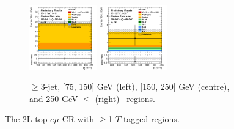 \begin{figure}[h!]
\begin{subfigure}[b]{\textwidth}
        \includegraphics[width=0.32\textwidth]{Images/VH/Own_fit/prefit_VHcc/Region_distpTV_BMax250_BMin150_Dtopemucr_J3_TTypeta_T2_L2_Y6051_Prefit.png}
        \includegraphics[width=0.32\textwidth]{Images/VH/Own_fit/prefit_VHcc/Region_distpTV_BMax400_BMin250_Dtopemucr_J3_TTypeta_T2_L2_Y6051_Prefit.png}
        \caption{$\geq$3-jet, [75, 150] GeV (left), [150, 250] GeV (centre), and 250  GeV $\leq$ (right) \ptv\ regions.}
        \label{fig:plots_VHcc_2L_topCRemu_3J}
    \end{subfigure}
    \caption{The 2L top $e\mu$ CR with $\geq$1 $T$-tagged regions.}
    \label{fig:plots_VHcc_2L_topCRemu}
\end{figure}
